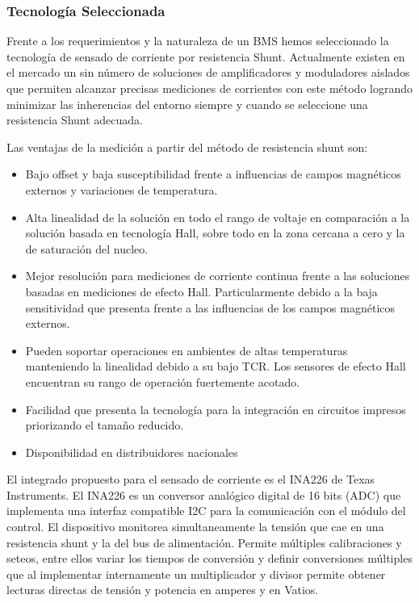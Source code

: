 \documentclass[10pt,a4paper]{article}
\begin{document}
    \clearpage

	\subsubsection{Tecnología Seleccionada}
	
	Frente a los requerimientos y la naturaleza de un BMS hemos seleccionado 
    la tecnología de sensado de corriente por resistencia Shunt. 
    Actualmente existen en el mercado un sin número de soluciones de 
    amplificadores y moduladores aislados que permiten alcanzar precisas 
    mediciones de corrientes con este método logrando minimizar las inherencias 
    del entorno siempre y cuando se seleccione una resistencia Shunt adecuada.
	
	\noindent Las ventajas de la medición a partir del método de resistencia 
    shunt son:
	
	\begin{itemize}
		\item Bajo offset y baja susceptibilidad frente a influencias de campos 
            magnéticos externos y variaciones de temperatura.
		\item Alta linealidad de la solución en todo el rango de voltaje en 
            comparación a la solución basada en tecnología Hall, sobre todo en 
            la zona cercana a cero y la de saturación del nucleo. 
		\item Mejor resolución para mediciones de corriente continua frente a 
            las soluciones basadas en mediciones de efecto Hall. 
            Particularmente debido a la baja sensitividad que presenta frente a 
            las influencias de los campos magnéticos externos.
		\item Pueden soportar operaciones en ambientes de altas temperaturas 
            manteniendo la linealidad debido a su bajo TCR. 
            Los sensores de efecto Hall encuentran su rango de operación 
            fuertemente acotado.
		\item Facilidad que presenta la tecnología para la integración en 
            circuitos impresos priorizando el tamaño reducido.
		\item Disponibilidad en distribuidores nacionales
	\end{itemize}
	
	\noindent El integrado propuesto para el sensado de corriente es el INA226 
    de Texas Instruments. El INA226 es un conversor analógico digital de 16 bits 
    (ADC) que implementa una interfaz compatible I2C para la comunicación con el 
    módulo del control. El dispositivo monitorea simultaneamente la tensión que 
    cae en una resistencia shunt y la del bus de alimentación. Permite múltiples 
    calibraciones y seteos, entre ellos variar los tiempos de conversión y 
    definir conversiones múltiples que al implementar internamente un 
    multiplicador y divisor permite obtener lecturas directas de tensión y 
    potencia en amperes y en Vatios.
	
\end{document}
